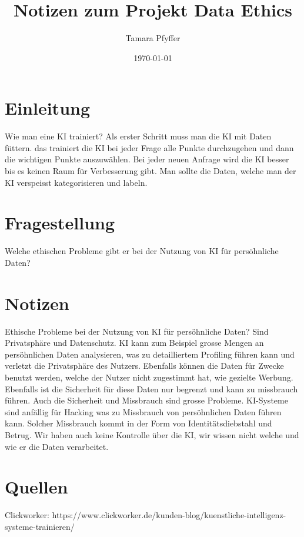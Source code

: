 \documentclass{article}
\title{Notizen zum Projekt Data Ethics}
\author{Tamara Pfyffer}
\date{\today}
\begin{document}
\maketitle


\tableofcontents
\section{Einleitung}
Wie man eine KI trainiert? Als erster Schritt muss man die KI mit Daten füttern. das trainiert die KI bei jeder Frage alle Punkte durchzugehen und dann die wichtigen Punkte auszuwählen. Bei jeder neuen Anfrage wird die KI besser bis es keinen Raum für Verbesserung gibt. Man sollte die Daten, welche man der KI verspeisst kategorisieren und labeln.

\section{Fragestellung}
Welche ethischen Probleme gibt er bei der Nutzung von KI für persöhnliche Daten? 

\section{Notizen}
Ethische Probleme bei der Nutzung von KI für persöhnliche Daten?
Sind Privatsphäre und Datenschutz. KI kann zum Beispiel grosse Mengen an persöhnlichen Daten analysieren, was zu detailliertem Profiling führen kann und verletzt die Privatsphäre des Nutzers. Ebenfalls können die Daten für Zwecke benutzt werden, welche der Nutzer nicht zugestimmt hat, wie gezielte Werbung. Ebenfalls ist die Sicherheit für diese Daten nur begrenzt und kann zu missbrauch führen.
Auch die Sicherheit und Missbrauch sind grosse Probleme. KI-Systeme sind anfällig für Hacking was zu Missbrauch von persöhnlichen Daten führen kann. Solcher Missbrauch kommt in der Form von Identitätsdiebstahl und Betrug.
Wir haben auch keine Kontrolle über die KI, wir wissen nicht welche und wie er die Daten verarbeitet.

\section{Quellen}
Clickworker: https://www.clickworker.de/kunden-blog/kuenstliche-intelligenz-systeme-trainieren/
\printbibliography
\end{document}
